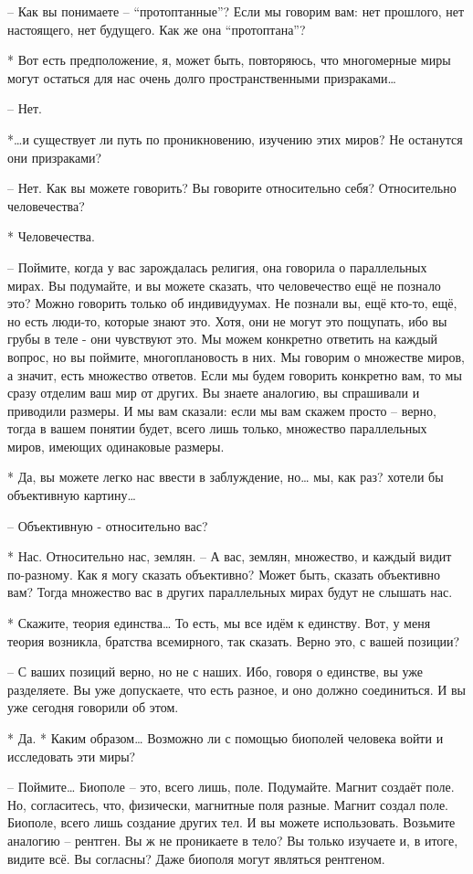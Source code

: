  – Как вы понимаете – “протоптанные”? Если мы говорим вам: нет прошлого, нет настоящего, нет будущего. Как же она “протоптана”?

 * Вот есть предположение, я, может быть, повторяюсь, что многомерные миры могут остаться для нас очень долго пространственными призраками…

 – Нет.

 *…и существует ли путь по проникновению, изучению этих миров? Не останутся они призраками?

 – Нет. Как вы можете говорить? Вы говорите относительно себя? Относительно человечества?

 * Человечества.

 – Поймите, когда у вас зарождалась религия, она говорила о параллельных мирах. Вы подумайте, и вы можете сказать, что человечество ещё не познало это? Можно говорить только об индивидуумах. Не познали вы, ещё кто-то, ещё, но есть люди-то, которые знают это. Хотя, они не могут это пощупать, ибо вы грубы в  теле - они чувствуют это. Мы можем конкретно ответить на каждый вопрос, но вы поймите, многоплановость в них. Мы говорим о множестве миров, а значит, есть множество ответов. Если мы будем говорить конкретно вам, то мы сразу отделим ваш мир от других. Вы знаете аналогию, вы спрашивали и приводили размеры. И мы вам сказали: если мы вам скажем просто – верно, тогда в вашем понятии будет, всего лишь только, множество параллельных миров, имеющих одинаковые размеры.

 * Да, вы можете легко нас ввести в заблуждение, но… мы, как раз? хотели бы объективную картину…

 – Объективную - относительно вас?

 * Нас. Относительно нас, землян.
 – А вас, землян, множество, и каждый видит по-разному. Как я могу сказать объективно? Может быть, сказать объективно вам? Тогда множество вас в других параллельных мирах будут не слышать нас.

 * Скажите, теория единства… То есть, мы все идём к единству. Вот, у меня теория возникла, братства всемирного, так сказать. Верно это, с вашей позиции?

 – С ваших позиций верно, но не с наших. Ибо, говоря о единстве, вы уже разделяете. Вы уже допускаете, что есть разное, и оно должно соединиться. И вы уже сегодня говорили об этом.

 * Да.
 * Каким образом… Возможно ли с помощью биополей человека войти и исследовать эти миры?

 – Поймите… Биополе – это, всего лишь, поле. Подумайте. Магнит создаёт поле. Но, согласитесь, что, физически, магнитные поля разные. Магнит создал поле. Биополе, всего лишь создание других тел. И вы можете использовать. Возьмите аналогию – рентген. Вы ж не проникаете в тело? Вы только изучаете и, в итоге, видите всё. Вы согласны? Даже биополя могут являться рентгеном.

